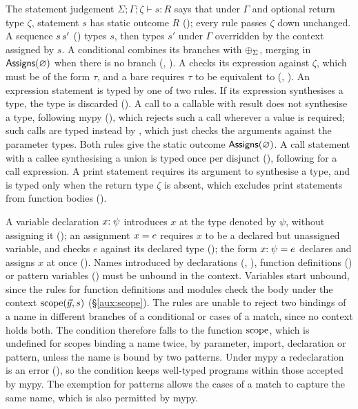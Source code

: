 The statement judgement $\Sigma; \Gamma; \zeta \vdash s : R$ says that under $\Gamma$ and
optional return type $\zeta$, statement $s$ has static outcome $R$ (); every rule passes $\zeta$ down unchanged.
A sequence $\exSeq{s}{s'}$ () types $s$, then types $s'$ under $\Gamma$ overridden by the context assigned
by $s$. A conditional combines its
branches with $\merge_{\Sigma}$, merging in $\Assigns{\varnothing}$ when there is no  branch (, ).
A
 checks its expression against $\zeta$, which must be of the form $\tau$, and a bare
 requires $\tau$ to be equivalent to  (, ). An expression statement is typed by one of two rules. If its expression synthesises a type, the
type is discarded (). A call to a callable with result \tyNone{} does not synthesise a
type, following mypy (), which
rejects such a call wherever a value is required; such calls are typed instead by , which
just checks the arguments against the parameter types. Both rules give the static outcome
$\Assigns{\varnothing}$. A call statement with a callee synthesising a union is typed
once per disjunct (), following  for a call expression.
A print statement requires its argument to synthesise a type, and is typed only when the return type $\zeta$ is
absent, which excludes print statements from function bodies ().

A variable declaration $x\exAnnot{\psi}$ introduces $x$ at the type denoted by $\psi$, without assigning it
(); an assignment $\exAssign{x}{e}$ requires $x$ to be a declared but unassigned variable, and
checks $e$ against its declared type (); the form $\exAssign{x\exAnnot{\psi}}{e}$ declares and
assigns $x$ at once (). Names introduced by declarations (, ), function definitions
() or pattern variables () must be unbound in the context. Variables start unbound,
since the rules for function definitions and modules check the body under the context $\scopeS(\seq{y}, s)$
(\S\ref{aux:scope}). The rules are unable to reject two bindings of a name in different branches of a conditional or
cases of a match, since no context holds both. The condition therefore falls to the function $\scopeS$, which is
undefined for scopes binding a name twice, by parameter, import, declaration or pattern, unless the name is bound by
two patterns. Under mypy a redeclaration is an error (), so the condition keeps well-typed
programs within those accepted by mypy. The exemption for patterns allows the cases of a match to capture the same
name, which is also permitted by mypy.

